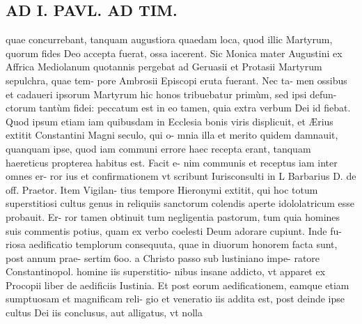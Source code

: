 \documentclass{article}
\begin{document}
\begin{pages}
\section*{AD I. PAVL. AD TIM. }
\marginpar{[ p.70 ]}\pstart quae concurrebant, tanquam augustiora quaedam loca, quod illic Martyrum, quorum fides Deo accepta fuerat, ossa iacerent. Sic Monica mater Augustini ex Affrica Mediolanum quotannis pergebat ad Geruasii et Protasii Martyrum sepulchra, quae tem- pore Ambrosii Episcopi eruta fuerant. Nec ta- men ossibus et cadaueri ipsorum Martyrum hic honos tribuebatur primùm, sed ipsi defun- ctorum tantùm fidei: peccatum est in eo tamen, quia extra verbum Dei id fiebat. Quod ipsum etiam iam quibusdam in Ecclesia bonis viris displicuit, et Ærius extitit Constantini Magni seculo, qui o- mnia illa et merito quidem damnauit, quanquam ipse, quod iam communi errore haec recepta erant, tanquam haereticus propterea habitus est. Facit e- nim communis et receptus iam inter omnes er- ror ius et confirmationem vt scribunt Iurisconsulti in L Barbarius D. de off. Praetor. Item Vigilan- tius tempore Hieronymi extitit, qui hoc totum superstitiosi cultus genus in reliquiis sanctorum colendis aperte idololatricum esse probauit. Er- ror tamen obtinuit tum negligentia pastorum, tum quia homines suis commentis potius, quam ex verbo coelesti Deum adorare cupiunt. Inde fu- riosa aedificatio templorum consequuta, quae in diuorum honorem facta sunt, post annum prae- sertim 6oo. a Christo passo sub lustiniano impe- ratore Constantinopol. homine iis superstitio- nibus insane addicto, vt apparet ex Procopii liber  de aedificiis Iustinia. Et post eorum aedificationem, eamque etiam sumptuosam et magnificam reli- gio et veneratio iis addita est, post deinde ipse cultus Dei iis conclusus, aut alligatus, vt nolla  \pend

\end{pages}
\end{document}
